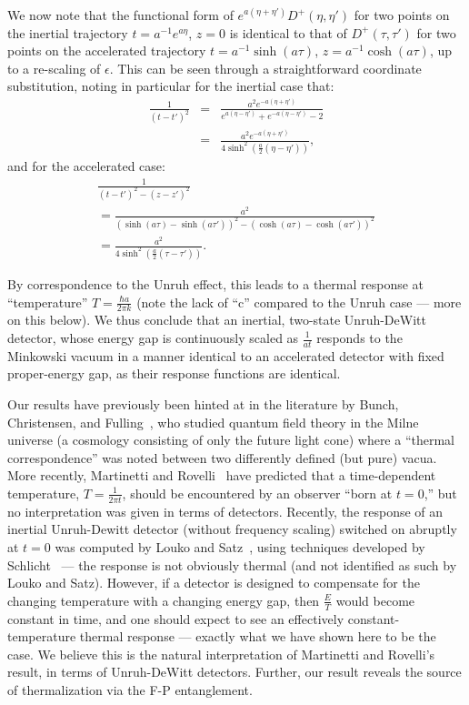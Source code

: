 \documentclass[aps,prl,showpacs,12pt]{revtex4}
\begin{document}
We now note that the functional form of $e^{a(\eta + \eta')}D^{+}(\eta, \eta')$ for two points on the inertial trajectory $t = a^{-1}e^{a \eta}$, $z=0$ is identical to that of $D^{+}(\tau, \tau')$ for two points on the accelerated trajectory $t = a^{-1} \sinh(a \tau )$, $z = a^{-1} \cosh(a \tau)$, up to a re-scaling of $\epsilon$.  This can be seen through a straightforward coordinate substitution, noting in particular for the inertial case that:
\begin{eqnarray*}
\frac{1}{(t - t')^{2}} &=& \frac{a^2 e^{-a(\eta + \eta')}}{e^{a (\eta - \eta')} + e^{- a (\eta - \eta')} - 2} \\
&=& \frac{a^2 e^{-a(\eta + \eta')}}{4 \sinh^{2}(\frac{a}{2}(\eta - \eta'))},
\end{eqnarray*}
and for the accelerated case:
\begin{gather*}
\frac{1}{(t - t')^{2} - (z - z')^{2}} \\
 = \frac{a^2}{(\sinh(a \tau) - \sinh(a \tau'))^{2} - (\cosh(a \tau) - \cosh(a \tau'))^{2}} \\
 = \frac{a^2}{4 \sinh^{2}(\frac{a}{2}(\tau - \tau'))}.
\end{gather*}

By correspondence to the Unruh effect, this leads to a thermal response at ``temperature'' $T = \frac{\hbar a}{2 \pi k}$ (note the lack of ``c'' compared to the Unruh case \---- more on this below).  We thus conclude that an inertial, two-state Unruh-DeWitt detector, whose energy gap is continuously scaled as $\frac{1}{at}$ responds to the Minkowski vacuum in a manner identical to an accelerated detector with fixed proper-energy gap, as their response functions are identical.

Our results have previously been hinted at in the literature by Bunch, Christensen, and Fulling~\cite{bunch1, birrell1}, who studied quantum field theory in the Milne universe (a cosmology consisting of only the future light cone) where a ``thermal correspondence'' was noted between two differently defined (but pure) vacua.  More recently, Martinetti and Rovelli~\cite{rovelli10} have predicted that a time-dependent temperature, $T = \frac{1}{2 \pi t}$, should be encountered by an observer ``born at $t=0$,'' but no interpretation was given in terms of detectors.  Recently, the response of an inertial Unruh-Dewitt detector (without frequency scaling) switched on abruptly at $t=0$ was computed by Louko and Satz~\cite{louko1}, using techniques developed by Schlicht~\cite{schlicht1} \---- the response is not obviously thermal (and not identified as such by Louko and Satz).  However, if a detector is designed to compensate for the changing temperature with a changing energy gap, then $\frac{E}{T}$ would become constant in time, and one should expect to see an effectively constant-temperature thermal response \---- exactly what we have shown here to be the case.  We believe this is the natural interpretation of Martinetti and Rovelli's result, in terms of Unruh-DeWitt detectors.  Further, our result reveals the source of thermalization via the F-P entanglement.
\end{document}
